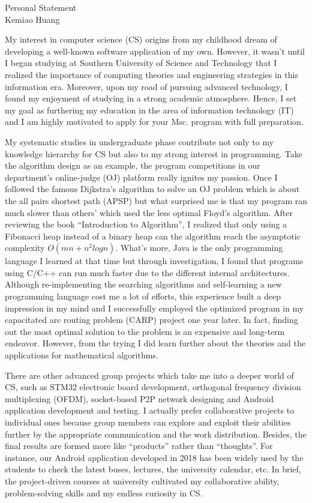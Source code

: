 \documentclass{article}
\newcommand{\ps}{Personal Statement}
\newcommand{\yourname}{Kemiao Huang}
\begin{document}
\begin{center}\LARGE\ps\\
\large \yourname\ 
\end{center}

\setlength{\parskip}{0.3\baselineskip}

My interest in computer science (CS) origins from my childhood dream of developing a well-known software application of my own. However, it wasn't until I began studying at Southern University of Science and Technology that I realized the importance of computing theories and engineering strategies in this information era. Moreover, upon my road of pursuing advanced technology, I found my enjoyment of studying in a strong academic atmosphere. Hence, I set my goal as furthering my education in the area of information technology (IT) and I am highly motivated to apply for your Msc. program with full preparation.

My systematic studies in undergraduate phase contribute not only to my knowledge hierarchy for CS but also to my strong interest in programming. Take the algorithm design as an example, the program competitions in our department's online-judge (OJ) platform really ignites my passion. Once I followed the famous Dijkstra's algorithm to solve an OJ problem which is about the all pairs shortest path (APSP) but what surprised me is that my program ran much slower than others' which used the less optimal Floyd's algorithm. After reviewing the book ``Introduction to Algorithm'', I realized that only using a Fibonacci heap instead of a binary heap can the algorithm reach the asymptotic complexity $O(mn + n^2 log n)$. What's more, Java is the only programming language I learned at that time but through investigation, I found that programs using C/C++ can run much faster due to the different internal architectures. Although re-implementing the searching algorithms and self-learning a new programming language cost me a lot of efforts, this experience built a deep impression in my mind and I successfully employed the optimized program in my capacitated arc routing problem (CARP) project one year later. In fact, finding out the most optimal solution to the problem is an expensive and long-term endeavor. However, from the trying I did learn further about the theories and the applications for mathematical algorithms. 

There are other advanced group projects which take me into a deeper world of CS, such as STM32 electronic board development, orthogonal frequency division multiplexing (OFDM), socket-based P2P network designing and Android application development and testing. I actually prefer collaborative projects to individual ones because group members can explore and exploit their abilities further by the appropriate communication and the work distribution. Besides, the final results are formed more like ``products'' rather than ``thoughts''. For instance, our Android application developed in 2018 has been widely used by the students to check the latest buses, lectures, the university calendar, etc. In brief, the project-driven courses at university cultivated my collaborative ability, problem-solving skills and my endless curiosity in CS. 
\end{document}
